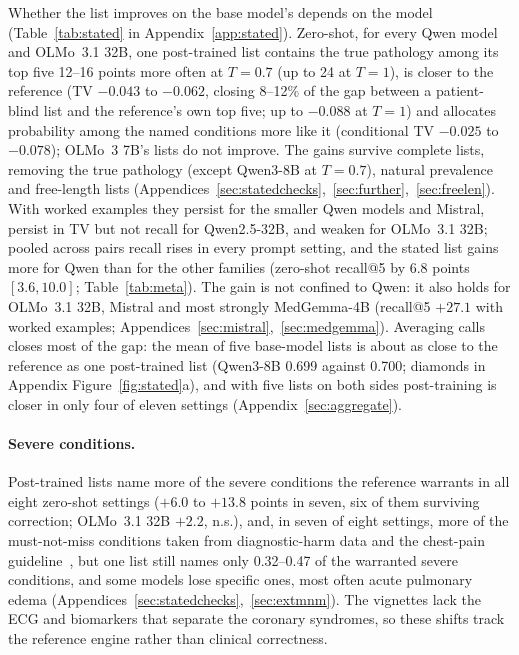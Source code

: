 \documentclass[wcp]{jmlr}
\begin{document}
Whether the list improves on the base model's depends on the model (Table~\ref{tab:stated} in Appendix~\ref{app:stated}). Zero-shot, for every Qwen model and OLMo~3.1 32B, one post-trained list contains the true pathology among its top five 12--16 points more often at $T{=}0.7$ (up to 24 at $T{=}1$), is closer to the reference (TV $-0.043$ to $-0.062$, closing 8--12\% of the gap between a patient-blind list and the reference's own top five; up to $-0.088$ at $T{=}1$) and allocates probability among the named conditions more like it (conditional TV $-0.025$ to $-0.078$); OLMo~3 7B's lists do not improve. The gains survive complete lists, removing the true pathology (except Qwen3-8B at $T{=}0.7$), natural prevalence and free-length lists (Appendices~\ref{sec:statedchecks},~\ref{sec:further},~\ref{sec:freelen}). With worked examples they persist for the smaller Qwen models and Mistral, persist in TV but not recall for Qwen2.5-32B, and weaken for OLMo~3.1 32B; pooled across pairs recall rises in every prompt setting, and the stated list gains more for Qwen than for the other families (zero-shot recall@5 by 6.8 points $[3.6,10.0]$; Table~\ref{tab:meta}). The gain is not confined to Qwen: it also holds for OLMo~3.1 32B, Mistral and most strongly MedGemma-4B (recall@5 $+27.1$ with worked examples; Appendices~\ref{sec:mistral},~\ref{sec:medgemma}). Averaging calls closes most of the gap: the mean of five base-model lists is about as close to the reference as one post-trained list (Qwen3-8B 0.699 against 0.700; diamonds in Appendix Figure~\ref{fig:stated}a), and with five lists on both sides post-training is closer in only four of eleven settings (Appendix~\ref{sec:aggregate}).

\paragraph{Severe conditions.}
Post-trained lists name more of the severe conditions the reference warrants in all eight zero-shot settings ($+6.0$ to $+13.8$ points in seven, six of them surviving correction; OLMo~3.1 32B $+2.2$, n.s.), and, in seven of eight settings, more of the must-not-miss conditions taken from diagnostic-harm data and the chest-pain guideline~\citep{newmantoker2024burden,gulati2021chestpain}, but one list still names only 0.32--0.47 of the warranted severe conditions, and some models lose specific ones, most often acute pulmonary edema (Appendices~\ref{sec:statedchecks},~\ref{sec:extmnm}). The vignettes lack the ECG and biomarkers that separate the coronary syndromes, so these shifts track the reference engine rather than clinical correctness.
\end{document}
